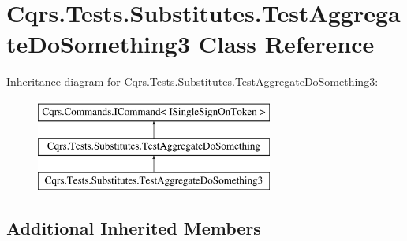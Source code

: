 \hypertarget{classCqrs_1_1Tests_1_1Substitutes_1_1TestAggregateDoSomething3}{}\section{Cqrs.\+Tests.\+Substitutes.\+Test\+Aggregate\+Do\+Something3 Class Reference}
\label{classCqrs_1_1Tests_1_1Substitutes_1_1TestAggregateDoSomething3}
Inheritance diagram for Cqrs.\+Tests.\+Substitutes.\+Test\+Aggregate\+Do\+Something3\+:\begin{figure}[H]
\begin{center}
\leavevmode
\includegraphics[height=3.000000cm]{classCqrs_1_1Tests_1_1Substitutes_1_1TestAggregateDoSomething3}
\end{center}
\end{figure}
\subsection*{Additional Inherited Members}
